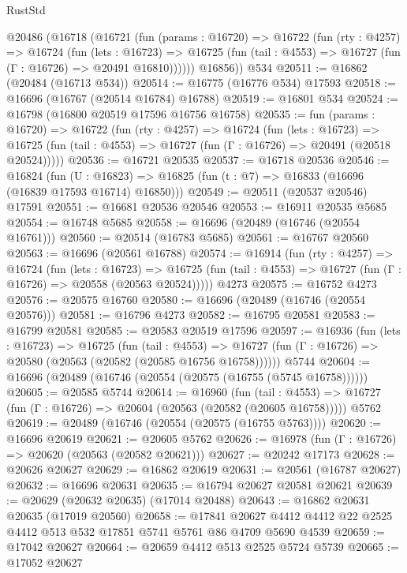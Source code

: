 \begin{lexlean}{RustStd}
\begin{coremodule}
    @20486
      (@16718
        (@16721
          (fun (params : @16720) =>
          @16722
            (fun (rty : @4257) =>
            @16724
              (fun (lets : @16723) =>
              @16725 (fun (tail : @4553) => @16727 (fun (Γ : @16726) => @20491 @16810))))))
        @16856))
    @534
@20511 := @16862 (@20484 (@16713 @534))
@20514 := @16775 (@16776 @534) @17593
@20518 := @16696 (@16767 (@20514 @16784) @16788)
@20519 := @16801 @534
@20524 := @16798 (@16800 @20519 @17596 @16756 @16758)
@20535 := fun (params : @16720) =>
  @16722
    (fun (rty : @4257) =>
    @16724
      (fun (lets : @16723) =>
      @16725 (fun (tail : @4553) => @16727 (fun (Γ : @16726) => @20491 (@20518 @20524)))))
@20536 := @16721 @20535
@20537 := @16718 @20536
@20546 := @16824
    (fun (U : @16823) => @16825 (fun (t : @7) => @16833 (@16696 (@16839 @17593 @16714) @16850)))
@20549 := @20511 (@20537 @20546) @17591
@20551 := @16681 @20536 @20546
@20553 := @16911 @20535 @5685
@20554 := @16748 @5685
@20558 := @16696 (@20489 (@16746 (@20554 @16761)))
@20560 := @20514 (@16783 @5685)
@20561 := @16767 @20560
@20563 := @16696 (@20561 @16788)
@20574 := @16914
    (fun (rty : @4257) =>
    @16724
      (fun (lets : @16723) =>
      @16725 (fun (tail : @4553) => @16727 (fun (Γ : @16726) => @20558 (@20563 @20524)))))
    @4273
@20575 := @16752 @4273
@20576 := @20575 @16760
@20580 := @16696 (@20489 (@16746 (@20554 @20576)))
@20581 := @16796 @4273
@20582 := @16795 @20581
@20583 := @16799 @20581
@20585 := @20583 @20519 @17596
@20597 := @16936
    (fun (lets : @16723) =>
    @16725
      (fun (tail : @4553) =>
      @16727 (fun (Γ : @16726) => @20580 (@20563 (@20582 (@20585 @16756 @16758))))))
    @5744
@20604 := @16696 (@20489 (@16746 (@20554 (@20575 (@16755 (@5745 @16758))))))
@20605 := @20585 @5744
@20614 := @16960
    (fun (tail : @4553) => @16727 (fun (Γ : @16726) => @20604 (@20563 (@20582 (@20605 @16758)))))
    @5762
@20619 := @20489 (@16746 (@20554 (@20575 (@16755 @5763))))
@20620 := @16696 @20619
@20621 := @20605 @5762
@20626 := @16978 (fun (Γ : @16726) => @20620 (@20563 (@20582 @20621)))
@20627 := @20242 @17173
@20628 := @20626 @20627
@20629 := @16862 @20619
@20631 := @20561 (@16787 @20627)
@20632 := @16696 @20631
@20635 := @16794 @20627 @20581 @20621
@20639 := @20629 (@20632 @20635) (@17014 @20488)
@20643 := @16862 @20631 @20635 (@17019 @20560)
@20658 := @17841
    @20627
    @4412
    @4412
    @22
    @2525
    @4412
    @513
    @532
    @17851
    @5741
    @5761
    @86
    @4709
    @5690
    @4539
@20659 := @17042 @20627
@20664 := @20659 @4412 @513 @2525 @5724 @5739
@20665 := @17052 @20627

\end{coremodule}
\end{lexlean}
